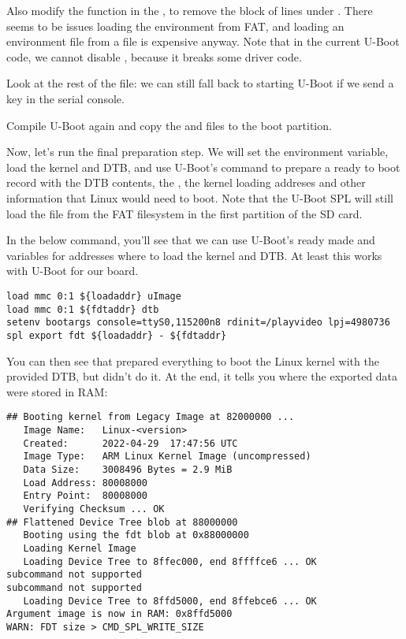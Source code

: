 Also modify the  function in the
, to remove the block
of lines under . There seems to be
issues loading the environment from FAT, and loading an environment file
from a file is expensive anyway. Note that in the current U-Boot code,
we cannot disable , because
it breaks some driver code.

Look at the rest of the  file:
we can still fall back to starting U-Boot if we send a  key
in the serial console.

Compile U-Boot again and copy the  and 
files to the boot partition.

Now, let's run the final preparation step. We will set the
 environment variable, load the kernel and DTB, and
use U-Boot's  command to prepare a ready to boot record
with the DTB contents, the , the kernel loading addreses
and other information that Linux would need to boot. Note that the
U-Boot SPL will still load the  file from the FAT
filesystem in the first partition of the SD card.

In the below command, you'll see that we can use U-Boot's ready made
 and  variables for addresses where to load
the kernel and DTB. At least this works with U-Boot for our board.

\begin{verbatim}
load mmc 0:1 ${loadaddr} uImage
load mmc 0:1 ${fdtaddr} dtb
setenv bootargs console=ttyS0,115200n8 rdinit=/playvideo lpj=4980736
spl export fdt ${loadaddr} - ${fdtaddr}
\end{verbatim}

You can then see that  prepared everything to boot the
Linux kernel with the provided DTB, but didn't do it. At the end, it
tells you where the exported data were stored in RAM:

\begin{verbatim}
## Booting kernel from Legacy Image at 82000000 ...
   Image Name:   Linux-<version>
   Created:      2022-04-29  17:47:56 UTC
   Image Type:   ARM Linux Kernel Image (uncompressed)
   Data Size:    3008496 Bytes = 2.9 MiB
   Load Address: 80008000
   Entry Point:  80008000
   Verifying Checksum ... OK
## Flattened Device Tree blob at 88000000
   Booting using the fdt blob at 0x88000000
   Loading Kernel Image
   Loading Device Tree to 8ffec000, end 8ffffce6 ... OK
subcommand not supported
subcommand not supported
   Loading Device Tree to 8ffd5000, end 8ffebce6 ... OK
Argument image is now in RAM: 0x8ffd5000
WARN: FDT size > CMD_SPL_WRITE_SIZE
\end{verbatim}

